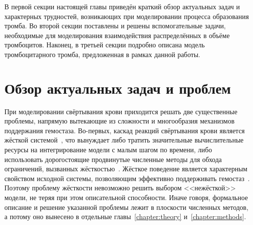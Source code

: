 В первой секции настоящей главы приведён краткий обзор актуальных задач и характерных трудностей,
возникающих при моделировании процесса образования тромба.
Во второй секции поставлены и решены вспомогательные задачи,
необходимые для моделирования взаимодействия распределённых в объёме тромбоцитов.
Наконец, в третьей секции подробно описана модель тромбоцитарного тромба,
предложенная в рамках данной работы.


\section{Обзор актуальных задач и проблем}
\label{section:problems_overview}

При моделировании свёртывания крови приходится решать две существенные проблемы,
напрямую вытекающие из сложности и многообразия механизмов поддержания гемостаза.
Во-первых, каскад реакций свёртывания крови является жёсткой системой~\cite{kastrup2007threshold, shen2008threshold, butakov2022two_methods},
что вынуждает либо тратить значительные вычислительные ресурсы на интегрирование модели с малым шагом по времени,
либо использовать дорогостоящие продвинутые численные методы для обхода ограничений,
вызванных жёсткостью~\cite{vassilevski2020parallel, butakov2022two_methods}.
Жёсткое поведение является характерным свойством исходной системы,
позволяющим эффективно поддерживать гемостаз~\cite{kastrup2007threshold, shen2008threshold}.
Поэтому проблему жёсткости невозможно решить выбором <<нежёсткой>> модели,
не теряя при этом описательной способности.
Иначе говоря, формальное описание и решение указанной проблемы лежит в плоскости численных методов,
а потому оно вынесено в отдельные главы~\ref{chapter:theory} и~\ref{chapter:methods}.

